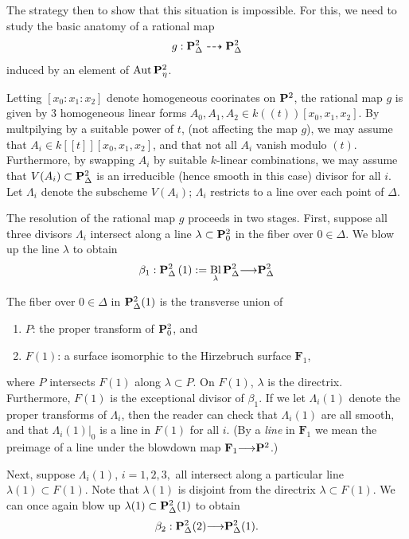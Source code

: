 \documentclass[12pt,reqno]{amsart}
\renewcommand{\k}{k}
\DeclareMathOperator{\Bl}{Bl}
\renewcommand{\to}{{\longrightarrow}}
\numberwithin{equation}{section}
\newcommand{\F}{\mathbf F}
\begin{document}
The strategy then to show that this situation is impossible.  For
this, we need to study the basic anatomy of a rational map
\[g: \P^{2}_{\Delta} \dashrightarrow \P^{2}_{\Delta} \] induced by an
element of $\Aut \P^{2}_{\eta}$.

Letting $[x_0 : x_1 : x_2]$ denote homogeneous coorinates on $\P^{2}$,
the rational map $g$ is given by $3$ homogeneous linear forms
$A_0, A_1, A_2 \in \k(\!(t)\!)[x_0,x_{1},x_{2}]$.  By multpilying by a
suitable power of $t$, (not affecting the map $g$), we may assume that
$A_{i} \in \k[\![t]\!][x_0, x_1, x_2]$, and that not all $A_i$ vanish
modulo $(t)$.  Furthermore, by swapping $A_{i}$ by suitable
$\k$-linear combinations, we may assume that
$V(A_{i}) \subset \P^{2}_{\Delta}$ is an irreducible (hence smooth in
this case) divisor for all $i$.  Let $\Lambda_{i}$ denote the
subscheme $V(A_{i})$; $\Lambda_{i}$ restricts to a line over each
point of $\Delta$.


The resolution of the rational map $g$ proceeds in two stages.  First,
suppose all three divisors $\Lambda_{i}$ intersect along a line
$\lambda \subset \P^{2}_{0}$ in the fiber over $0 \in \Delta$.  We
blow up the line $\lambda$ to obtain
\[ \beta_{1}: \P^{2}_{\Delta}\left(1 \right) :=
  \Bl_{\lambda}\P^{2}_{\Delta} \to \P^{2}_{\Delta}\]

The fiber over $0 \in \Delta$ in $\P^{2}_{\Delta}(1)$ is the
transverse union of
\begin{enumerate}
\item $P$: the proper transform of $\P^{2}_{0}$, and\\
\item $F(1)$: a surface isomorphic to the Hirzebruch surface $\F_{1}$,
\end{enumerate}
where $P$ intersects $F(1)$ along $\lambda \subset P$.  On $F(1)$,
$\lambda$ is the directrix. Furthermore, $F(1)$ is the exceptional
divisor of $\beta_{1}$.  If we let $\Lambda_{i}(1)$ denote the proper
transforms of $\Lambda_{i}$, then the reader can check that
$\Lambda_{i}(1)$ are all smooth, and that $\Lambda_{i}(1)\big|_{0}$ is
a line in $F(1)$ for all $i$.  (By a {\sl line} in $\F_{1}$ we mean
the preimage of a line under the blowdown map $\F_{1} \to \P^{2}$.)

Next, suppose $\Lambda_{i}(1)$, $i=1,2,3,$ all intersect along a
particular line $\lambda(1) \subset F(1)$. Note that $\lambda(1)$ is
disjoint from the directrix $\lambda \subset F(1)$.  We can once again
blow up $\lambda(1) \subset \P^{2}_{\Delta}(1)$ to obtain
\[\beta_{2}: \P^{2}_{\Delta}(2) \to \P^{2}_{\Delta}(1).\]
\end{document}
